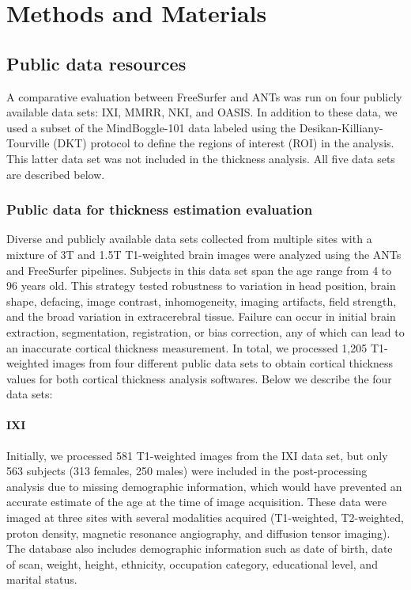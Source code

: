 \section{Methods and Materials}

\subsection{Public data resources}

A comparative evaluation between FreeSurfer and ANTs was
run on four publicly available data sets:
IXI, MMRR, NKI, and OASIS. 
In addition to these data, we used a subset of the MindBoggle-101 data
labeled using the  Desikan-Killiany-Tourville (DKT) protocol \citep{klein2012} 
to define the regions of interest (ROI) in the analysis.  This latter data set 
was not included in the thickness analysis.
All five data sets are described below.

\subsubsection{Public data for thickness estimation evaluation}

Diverse and publicly available data sets collected
from multiple sites with a mixture of 3T and
1.5T T1-weighted brain images were analyzed using the
ANTs and FreeSurfer pipelines.  Subjects in this data set  
span the age range from 4 to 96 years old.  This strategy tested robustness to
variation in head position, brain shape, defacing, image contrast, inhomogeneity, imaging
artifacts, field strength, and the broad variation in extracerebral tissue.  Failure
can occur in initial brain extraction, segmentation, registration, or
bias correction, any of which can lead to an inaccurate cortical
thickness measurement.                           
In total, we processed 1,205 T1-weighted images from four different
public data sets to obtain cortical thickness values for both 
cortical thickness analysis softwares.
Below we describe the four data sets:
                                          
\paragraph{IXI}
Initially, we processed 581 T1-weighted images from the IXI
 data set, but only 563 subjects
(313 females, 250 males) were included in the post-processing analysis due to 
missing demographic information, which would have prevented an accurate estimate of
the age at the time of image acquisition.  These data were
imaged at three sites 
with several modalities acquired (T1-weighted, T2-weighted, proton density, magnetic 
resonance angiography, and diffusion tensor imaging).  The 
database also includes demographic information such as date of birth, date
of scan, weight,
height, ethnicity, occupation category, educational level, and marital status.

